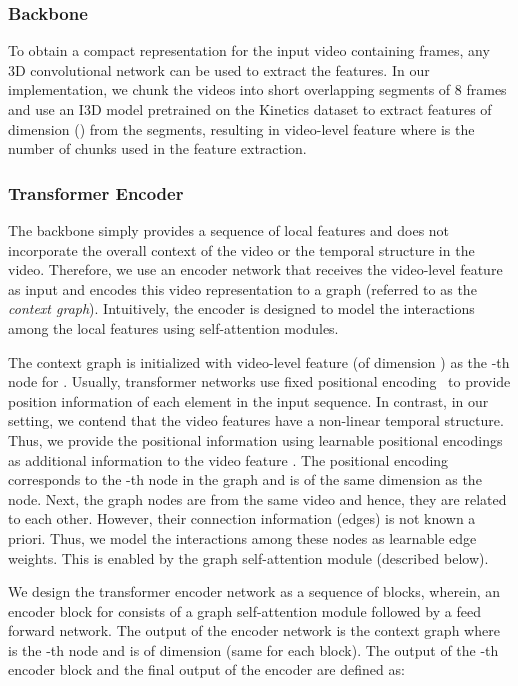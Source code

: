 \documentclass[10pt,twocolumn,letterpaper]{article}
\begin{document}
\subsubsection{Backbone} \label{subsec:backbone}
To obtain a compact representation for the input video  containing  frames, any 3D convolutional network can be used to extract the features. In our implementation, we chunk the videos into short overlapping segments of 8 frames and use an I3D model pretrained on the Kinetics\cite{carreira2017quo} dataset to extract features of dimension  () from the segments, resulting in video-level feature  where  is the number of chunks used in the feature extraction. 

\subsubsection{Transformer Encoder}\label{subsec:encoder}
The backbone simply provides a sequence of local features and does not incorporate the overall context of the video or the temporal structure in the video. Therefore, we use an encoder network that receives the video-level feature as input and encodes this video representation to a graph (referred to as the \textit{context graph}). Intuitively, the encoder is designed to model the interactions among the local features using self-attention modules. 

The context graph is initialized with video-level feature  (of dimension ) as the -th node for . Usually, transformer networks use fixed positional encoding~\cite{parmar2018image} to provide position information of each element in the input sequence. In contrast, in our setting, we contend that the video features have a non-linear temporal structure.
Thus, we provide the positional information using learnable positional encodings  as additional information to the video feature . The positional encoding  corresponds to the -th node in the graph and is of the same dimension as the node.
Next, the graph nodes are from the same video and hence, they are related to each other. However, their connection information (edges) is not known a priori. Thus, we model the interactions among these nodes as learnable edge weights. This is enabled by the graph self-attention module (described below). 

We design the transformer encoder network  as a sequence of  blocks, wherein, an  encoder block  for  consists of a graph self-attention module  followed by a feed forward network. 
The output of the encoder network is the context graph  where  is the -th node and is of dimension  (same for each block). The output of the -th encoder block  and the final output of the encoder  are defined as:
\end{document}
